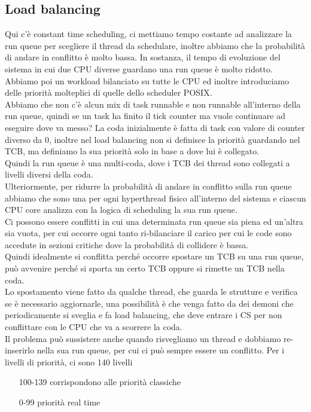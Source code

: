 \documentclass[12pt, oneside]{extbook}
\begin{document}
\subsection{Load balancing}
Qui c'è constant time scheduling, ci mettiamo tempo costante ad analizzare la run queue per scegliere il thread da schedulare, inoltre abbiamo che la probabilità di andare in conflitto è molto bassa. In sostanza, il tempo di evoluzione del sistema in cui due CPU diverse guardano una run queue è molto ridotto. Abbiamo poi un workload bilanciato su tutte le CPU ed inoltre introduciamo delle priorità molteplici di quelle dello scheduler POSIX.\\Abbiamo che non c'è alcun mix di task runnable e non runnable all'interno della run queue, quindi se un task ha finito il tick counter ma vuole continuare ad eseguire dove va messo? La coda inizialmente è fatta di task con valore di counter diverso da 0, inoltre nel load balancing non si definisce la priorità guardando nel TCB, ma definiamo la sua priorità solo in base a dove lui è collegato.\\Quindi la run queue è una multi-coda, dove i TCB dei thread sono collegati a livelli diversi della coda.\\Ulteriormente, per ridurre la probabilità di andare in conflitto sulla run queue abbiamo che sono una per ogni hyperthread fisico all'interno del sistema e ciascun CPU core analizza con la logica di scheduling la sua run queue.\\Ci possono essere conflitti in cui una determinata run queue sia piena ed un'altra sia vuota, per cui occorre ogni tanto ri-bilanciare il carico per cui le code sono accedute in sezioni critiche dove la probabilità di collidere è bassa.\\Quindi idealmente si conflitta perché occorre spostare un TCB su una run queue, può avvenire perché si sporta un certo TCB oppure si rimette un TCB nella coda.\\Lo spostamento viene fatto da qualche thread, che guarda le strutture e verifica se è necessario aggiornarle, una possibilità è che venga fatto da dei demoni che periodicamente si sveglia e fa load balancing, che deve entrare i CS per non conflittare con le CPU che va a scorrere la coda.\\Il problema può sussistere anche quando risvegliamo un thread e dobbiamo re-inserirlo nella sua run queue, per cui ci può sempre essere un conflitto. Per i livelli di priorità, ci sono 140 livelli
\begin{itemize}
\item [100-139] corrispondono alle priorità classiche
\item [0-99] priorità real time
\end{itemize}
\end{document}
